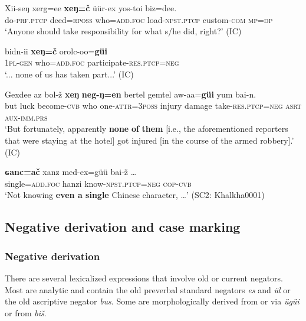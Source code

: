 \documentclass[output=paper,colorlinks,citecolor=brown,chinesefont]{langscibook}
\begin{document}
\ea\label{ex:kha:60}
    \gll Xii-seŋ xerg=ee \textbf{xeŋ=č} üür-ex yos-toi biz=dee. \\ 
         do-\textsc{prf.ptcp} deed=\textsc{rposs} who=\textsc{add.foc} load-\textsc{npst.ptcp} custom-\textsc{com} \textsc{mp=dp} \\
    \glt ‘Anyone should take responsibility for what s/he did, right?’ (IC) 
\z 

\ea\label{ex:kha:61}
    \gll bidn-ii \textbf{xeŋ=č} orolc-oo=\textbf{güi} \\ 
         \textsc{1pl-gen} who=\textsc{add.foc} participate-\textsc{res.ptcp=neg} \\
    \glt  ‘... none of us has taken part...’ (IC)
\z 

\ea\label{ex:kha:62}
    \gll Gexdee   az bol-ž \textbf{xeŋ} \textbf{neg-ŋ=en} bertel gemtel aw-aa=\textbf{güi} yum bai-n. \\ 
         but luck become-\textsc{cvb} who one-\textsc{attr=3poss} injury damage take-\textsc{res.ptcp=neg} \textsc{asrt} \textsc{aux-imm.prs} \\
    \glt ‘But fortunately, apparently \textbf{none} \textbf{of} \textbf{them} [i.e., the aforementioned reporters that were staying at the hotel] got injured [in the course of the armed robbery].’ (IC)
\z 

\ea\label{ex:kha:63} 
    \gll \textbf{ɢanc=ač} xanz med-ex={güü} bai-ž … \\ 
         single=\textsc{add.foc} hanzi know-\textsc{npst.ptcp=neg} \textsc{cop-cvb} \\
    \glt ‘{Not} knowing \textbf{even a single} Chinese character, …’ (SC2: Khalkha0001) 
\z 

\subsection{Negative derivation and case marking}\label{sec:kha:3.3}
\subsubsection{Negative derivation}\label{sec:kha:3.3.1}

There are several lexicalized expressions that involve old or current negators. Most are analytic and contain the old preverbal standard negators \textit{es} and \textit{ül} or the old ascriptive negator \textit{bus}. Some are morphologically derived from or via \textit{ügüi} or from \textit{biš}. 
\end{document}
